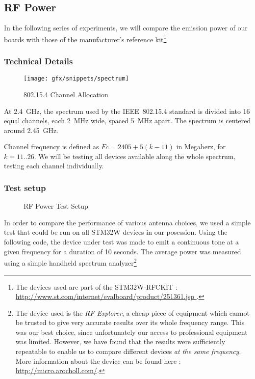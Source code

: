 \subsection{RF Power}

In the following series of experiments, we will compare the emission power of
our boards with those of the manufacturer's reference kit\footnote{The devices
used are part of the STM32W-RFCKIT
: \url{ http://www.st.com/internet/evalboard/product/251361.jsp }.}

\subsubsection{Technical Details}

\begin{figure}[htb]
  \begin{center}
    \texttt{[image: gfx/snippets/spectrum]}
  \end{center}
  \caption{802.15.4 Channel Allocation\citep{hunn2010}}
  \label{fig:channel-allocation}
\end{figure}

At \SI{2.4}{GHz}, the spectrum used by the IEEE~802.15.4 standard is divided
into 16 equal channels, each \SI{2}{MHz} wide, spaced \SI{5}{MHz} apart. The
spectrum is centered around \SI{2.45}{GHz}.\citep[pg. 29]{ieee802154}

Channel frequency is defined as $Fc = 2405 + 5 (k-11)$ in Megaherz, for $k
= 11..26$. We will be testing all devices available along the whole spectrum,
testing each channel individually.

\subsubsection{Test setup}

\begin{figure}[htb]
  \begin{center}
  \end{center}
  \caption{RF Power Test Setup}
  \label{fig:power-test-setup}
\end{figure}

In order to compare the performance of various antenna choices, we used a simple
test that could be run on all STM32W devices in our posession. Using the
following code, the device under test was made to emit a continuous tone at
a given frequency for a duration of 10 seconds. The average power was measured
using a simple handheld spectrum analyzer\footnote{The device used is the
\emph{RF Explorer}, a cheap piece of equipment which cannot be trusted to give
very accurate results over its whole frequency range. This was our best choice,
since unfortunately our access to professional equipment was limited. However,
we have found that the results were sufficiently repeatable to enable us to
compare different devices \emph{at the same frequency}. More information about
the device can be found here : \url{http://micro.arocholl.com/}.}

